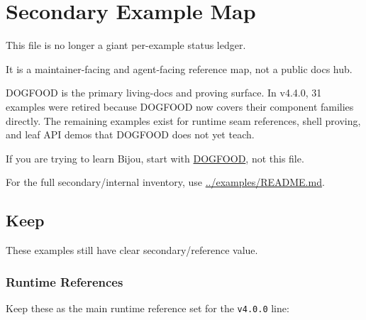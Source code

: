 \chapter{Secondary Example Map}\label{record-007}

\smallskip

This file is no longer a giant per-example status ledger.

It is a maintainer-facing and agent-facing reference map, not a public docs hub.

DOGFOOD is the primary living-docs and proving surface. In v4.4.0, 31 examples were retired because DOGFOOD now covers their component families directly. The remaining examples exist for runtime seam references, shell proving, and leaf API demos that DOGFOOD does not yet teach.

If you are trying to learn Bijou, start with \href{https://github.com/flyingrobots/bijou/blob/cbd70612140e7a450d764b3c7be1c6af878b99bc/docs/DOGFOOD.md}{DOGFOOD}, not this file.

For the full secondary/internal inventory, use \href{https://github.com/flyingrobots/bijou/blob/cbd70612140e7a450d764b3c7be1c6af878b99bc/examples/README.md}{../examples/README.md}.

\section{Keep}\label{record-007-keep}

These examples still have clear secondary/reference value.

\subsection{Runtime References}\label{record-007-runtime-references}

Keep these as the main runtime reference set for the \texttt{v\allowbreak{}4\allowbreak{}.\allowbreak{}0\allowbreak{}.\allowbreak{}0} line:

